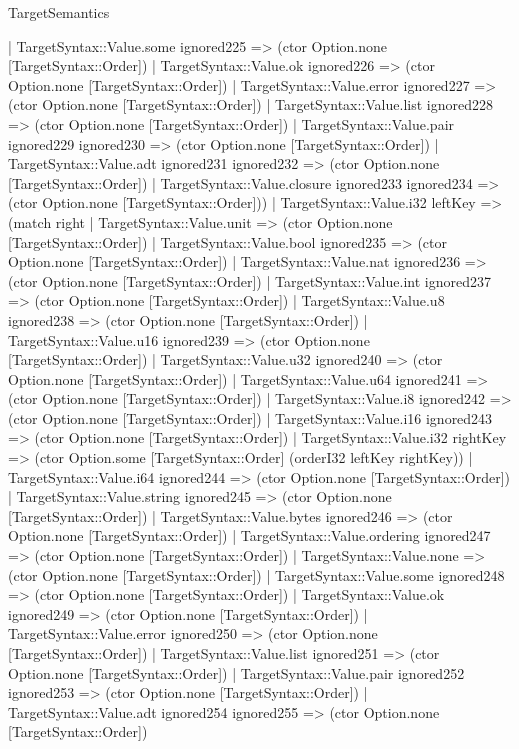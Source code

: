 \begin{lexlean}{TargetSemantics}
\begin{semanticmodule}
{      | TargetSyntax::Value.some ignored225 => (ctor Option.none [TargetSyntax::Order])
      | TargetSyntax::Value.ok ignored226 => (ctor Option.none [TargetSyntax::Order])
      | TargetSyntax::Value.error ignored227 => (ctor Option.none [TargetSyntax::Order])
      | TargetSyntax::Value.list ignored228 => (ctor Option.none [TargetSyntax::Order])
      | TargetSyntax::Value.pair ignored229 ignored230 => (ctor Option.none [TargetSyntax::Order])
      | TargetSyntax::Value.adt ignored231 ignored232 => (ctor Option.none [TargetSyntax::Order])
      | TargetSyntax::Value.closure ignored233 ignored234 => (ctor Option.none [TargetSyntax::Order]))
    | TargetSyntax::Value.i32 leftKey => (match right
      | TargetSyntax::Value.unit => (ctor Option.none [TargetSyntax::Order])
      | TargetSyntax::Value.bool ignored235 => (ctor Option.none [TargetSyntax::Order])
      | TargetSyntax::Value.nat ignored236 => (ctor Option.none [TargetSyntax::Order])
      | TargetSyntax::Value.int ignored237 => (ctor Option.none [TargetSyntax::Order])
      | TargetSyntax::Value.u8 ignored238 => (ctor Option.none [TargetSyntax::Order])
      | TargetSyntax::Value.u16 ignored239 => (ctor Option.none [TargetSyntax::Order])
      | TargetSyntax::Value.u32 ignored240 => (ctor Option.none [TargetSyntax::Order])
      | TargetSyntax::Value.u64 ignored241 => (ctor Option.none [TargetSyntax::Order])
      | TargetSyntax::Value.i8 ignored242 => (ctor Option.none [TargetSyntax::Order])
      | TargetSyntax::Value.i16 ignored243 => (ctor Option.none [TargetSyntax::Order])
      | TargetSyntax::Value.i32 rightKey => (ctor Option.some [TargetSyntax::Order] (orderI32 leftKey rightKey))
      | TargetSyntax::Value.i64 ignored244 => (ctor Option.none [TargetSyntax::Order])
      | TargetSyntax::Value.string ignored245 => (ctor Option.none [TargetSyntax::Order])
      | TargetSyntax::Value.bytes ignored246 => (ctor Option.none [TargetSyntax::Order])
      | TargetSyntax::Value.ordering ignored247 => (ctor Option.none [TargetSyntax::Order])
      | TargetSyntax::Value.none => (ctor Option.none [TargetSyntax::Order])
      | TargetSyntax::Value.some ignored248 => (ctor Option.none [TargetSyntax::Order])
      | TargetSyntax::Value.ok ignored249 => (ctor Option.none [TargetSyntax::Order])
      | TargetSyntax::Value.error ignored250 => (ctor Option.none [TargetSyntax::Order])
      | TargetSyntax::Value.list ignored251 => (ctor Option.none [TargetSyntax::Order])
      | TargetSyntax::Value.pair ignored252 ignored253 => (ctor Option.none [TargetSyntax::Order])
      | TargetSyntax::Value.adt ignored254 ignored255 => (ctor Option.none [TargetSyntax::Order])
}
\end{semanticmodule}
\end{lexlean}
